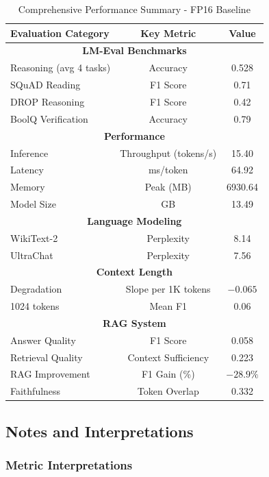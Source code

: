 \begin{table}[h]
\centering
\caption{Comprehensive Performance Summary - FP16 Baseline}
\label{tab:summary}
\begin{tabular}{@{}lcc@{}}
\toprule
\textbf{Evaluation Category} & \textbf{Key Metric} & \textbf{Value} \\
\midrule
\multicolumn{3}{c}{\textbf{LM-Eval Benchmarks}} \\
\midrule
Reasoning (avg 4 tasks) & Accuracy & 0.528 \\
SQuAD Reading & F1 Score & 0.71 \\
DROP Reasoning & F1 Score & 0.42 \\
BoolQ Verification & Accuracy & 0.79 \\
\midrule
\multicolumn{3}{c}{\textbf{Performance}} \\
\midrule
Inference & Throughput (tokens/s) & 15.40 \\
Latency & ms/token & 64.92 \\
Memory & Peak (MB) & 6930.64 \\
Model Size & GB & 13.49 \\
\midrule
\multicolumn{3}{c}{\textbf{Language Modeling}} \\
\midrule
WikiText-2 & Perplexity & 8.14 \\
UltraChat & Perplexity & 7.56 \\
\midrule
\multicolumn{3}{c}{\textbf{Context Length}} \\
\midrule
Degradation & Slope per 1K tokens & $-0.065$ \\
1024 tokens & Mean F1 & 0.06 \\
\midrule
\multicolumn{3}{c}{\textbf{RAG System}} \\
\midrule
Answer Quality & F1 Score & 0.058 \\
Retrieval Quality & Context Sufficiency & 0.223 \\
RAG Improvement & F1 Gain (\%) & $-28.9\%$ \\
Faithfulness & Token Overlap & 0.332 \\
\bottomrule
\end{tabular}
\end{table}

\newpage
\subsection{Notes and Interpretations}

\subsubsection*{Metric Interpretations}

